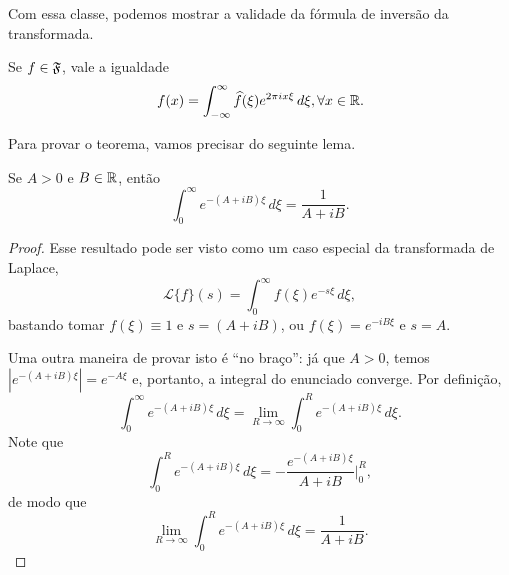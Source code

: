         Com essa classe, podemos mostrar a validade da fórmula de inversão da transformada.
        \begin{teorema}
        \label{teo-inv-transf-fourier}
            Se $f\in\mathfrak{F}$, vale a igualdade
            \begin{equation*}
                f(x) = \int_{-\infty}^{\infty} \widehat{f}(\xi) e^{2\pi ix\xi} \, d\xi, \forall x\in\mathbb{R}.
            \end{equation*}
        \end{teorema}
        Para provar o teorema, vamos precisar do seguinte lema.
        \begin{lema}
        \label{lema-int-exp}
            Se $A>0$ e $B\in\mathbb{R}$, então
            \begin{equation*}
                \int_0^{\infty} e^{-(A+iB)\xi} \, d\xi = \frac{1}{A+iB}.
            \end{equation*}
        \end{lema}
        \begin{proof}
            Esse resultado pode ser visto como um caso especial da transformada de Laplace,
            \begin{equation*}
                \mathcal{L}\{f\}(s) = \int_0^{\infty} f(\xi) e^{-s\xi} \, d\xi,
            \end{equation*}
            bastando tomar 
            $f(\xi)\equiv 1$ e $s = (A+iB)$, ou 
            $f(\xi) = e^{-iB\xi}$ e $s = A$.
            
            Uma outra maneira de provar isto é ``no braço'': já que $A > 0$, temos $|e^{-(A+iB)\xi}| = e^{-A\xi}$
            e, portanto, a integral do enunciado converge. Por definição,
            \begin{equation*}
                \int_0^{\infty} e^{-(A+iB)\xi} \, d\xi = \lim_{R\to\infty} \int_0^R e^{-(A+iB)\xi} \, d\xi.
            \end{equation*}
            Note que
            \begin{equation*}
                \int_0^R e^{-(A+iB)\xi} \, d\xi = -\frac{e^{-(A+iB)\xi}}{A+iB}\Bigg|_0^R,
            \end{equation*}
            de modo que
            \begin{equation*}
                \lim_{R\to\infty} \int_0^R e^{-(A+iB)\xi} \, d\xi = \frac{1}{A+iB}.
            \end{equation*}
        \end{proof}
        
